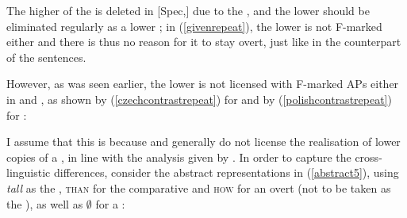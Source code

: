 The higher  of the  is deleted in [Spec,] due to the , and the lower  should be eliminated regularly as a lower ; in (\ref{givenrepeat}), the lower  is not F-marked either and there is thus no reason for it to stay overt, just like in the  counterpart of the sentences.

However, as was seen earlier, the lower  is not licensed with F-marked APs either in  and , as shown by (\ref{czechcontrastrepeat}) for  and by (\ref{polishcontrastrepeat}) for :

\ea \label{czechpolish}
\z
\z

I assume that this is because  and  generally do not license the realisation of lower copies of a , in line with the analysis given by \citet{boskovic2002}. In order to capture the cross-linguistic differences, consider the abstract representations in (\ref{abstract5}), using \textit{tall} as the , \textsc{than} for the comparative  and \textsc{how} for an overt  (not to be taken as the  ), as well as $\emptyset$ for a :

\ea \label{abstract5}
 \label{confighowtall}
 \label{confighowgaptall}
 \label{configzerotall}
 \label{configzerotalllower}
 \label{configzerotallnolower}
 \label{configzero}
 \label{confighowtallcontrast}
 \label{confighowgaptallcontrast}
 \label{configzerotallcontrast}
 \label{configzerotalllowercontrast}
 \label{configzerotallnolowercontrast}
 \label{configzerocontrast}
\z
\z

